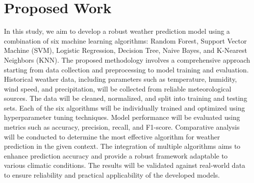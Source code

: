 \documentclass[conference, onecolumn]{IEEEtran}
\begin{document}
\section{\textbf{Proposed Work}}
In this study, we aim to develop a robust weather prediction model using a combination of six machine learning algorithms: Random Forest, Support Vector Machine (SVM), Logistic Regression, Decision Tree, Naive Bayes, and K-Nearest Neighbors (KNN). The proposed methodology involves a comprehensive approach starting from data collection and preprocessing to model training and evaluation. Historical weather data, including parameters such as temperature, humidity, wind speed, and precipitation, will be collected from reliable meteorological sources. The data will be cleaned, normalized, and split into training and testing sets. Each of the six algorithms will be individually trained and optimized using hyperparameter tuning techniques. Model performance will be evaluated using metrics such as accuracy, precision, recall, and F1-score. Comparative analysis will be conducted to determine the most effective algorithm for weather prediction in the given context. The integration of multiple algorithms aims to enhance prediction accuracy and provide a robust framework adaptable to various climatic conditions. The results will be validated against real-world data to ensure reliability and practical applicability of the developed models.
\end{document}
